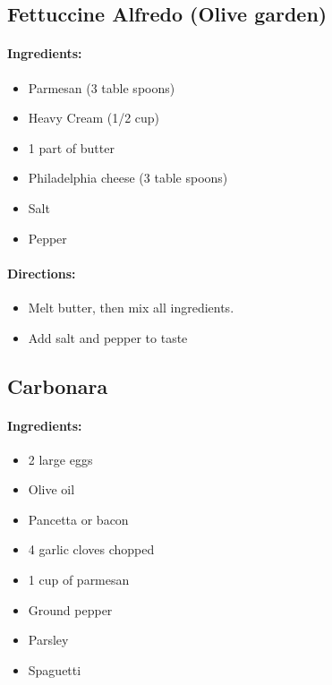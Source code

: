 \documentclass{article}
\begin{document}
\subsection{Fettuccine Alfredo (Olive garden)}

\paragraph{Ingredients:}

\begin{itemize}
	\item Parmesan (3 table spoons)
	\item Heavy Cream (1/2 cup)
	\item 1 part of butter
	\item Philadelphia cheese (3 table spoons)
	\item Salt
	\item Pepper
\end{itemize}

\paragraph{Directions:}
\begin{itemize}
	\item Melt butter, then mix all ingredients.
	\item Add salt and pepper to taste
\end{itemize}

\subsection{Carbonara}

\paragraph{Ingredients:}

\begin{itemize}
	\item 2 large eggs
	\item Olive oil
	\item Pancetta or bacon
	\item 4 garlic cloves chopped
	\item 1 cup of parmesan
	\item Ground pepper
	\item Parsley
	\item Spaguetti
\end{itemize}
\end{document}
